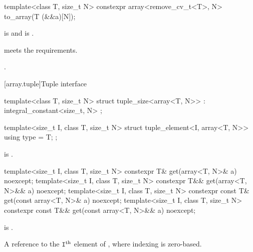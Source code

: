 %
\begin{itemdecl}
template<class T, size_t N>
  constexpr array<remove_cv_t<T>, N> to_array(T (&&a)[N]);
\end{itemdecl}

\begin{itemdescr}
\pnum
\mandates
{} is  and
 is .

\pnum
\expects
{} meets the  requirements.

\pnum
\returns
{}.
\end{itemdescr}

[array.tuple]{Tuple interface}
%
%
%
%
\begin{itemdecl}
template<class T, size_t N>
  struct tuple_size<array<T, N>> : integral_constant<size_t, N> { };
\end{itemdecl}

%
\begin{itemdecl}
template<size_t I, class T, size_t N>
  struct tuple_element<I, array<T, N>> {
    using type = T;
  };
\end{itemdecl}

\begin{itemdescr}
\pnum
\mandates
{} is .
\end{itemdescr}

%
\begin{itemdecl}
template<size_t I, class T, size_t N>
  constexpr T& get(array<T, N>& a) noexcept;
template<size_t I, class T, size_t N>
  constexpr T&& get(array<T, N>&& a) noexcept;
template<size_t I, class T, size_t N>
  constexpr const T& get(const array<T, N>& a) noexcept;
template<size_t I, class T, size_t N>
  constexpr const T&& get(const array<T, N>&& a) noexcept;
\end{itemdecl}

\begin{itemdescr}
\pnum
\mandates
{} is .

\pnum
\returns
A reference to the $\tcode{I}^\text{th}$ element of ,
where indexing is zero-based.
\end{itemdescr}

